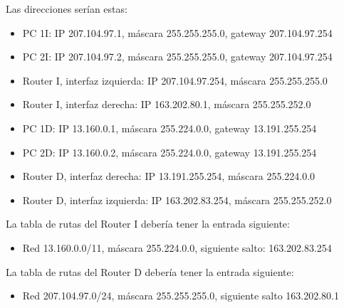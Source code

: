 \documentclass[letterpaper,10pt,spanish]{sphinxmanual}
\begin{document}
\sphinxAtStartPar
Las direcciones serían estas:
\begin{itemize}
\item {} 
\sphinxAtStartPar
PC 1I: IP 207.104.97.1, máscara 255.255.255.0, gateway 207.104.97.254

\item {} 
\sphinxAtStartPar
PC 2I: IP 207.104.97.2, máscara 255.255.255.0, gateway 207.104.97.254

\item {} 
\sphinxAtStartPar
Router I, interfaz izquierda: IP 207.104.97.254, máscara 255.255.255.0

\item {} 
\sphinxAtStartPar
Router I, interfaz derecha: IP 163.202.80.1, máscara 255.255.252.0

\item {} 
\sphinxAtStartPar
PC 1D: IP 13.160.0.1, máscara 255.224.0.0, gateway 13.191.255.254

\item {} 
\sphinxAtStartPar
PC 2D: IP 13.160.0.2, máscara 255.224.0.0, gateway 13.191.255.254

\item {} 
\sphinxAtStartPar
Router D, interfaz derecha: IP 13.191.255.254, máscara 255.224.0.0

\item {} 
\sphinxAtStartPar
Router D, interfaz izquierda: IP 163.202.83.254, máscara 255.255.252.0

\end{itemize}

\sphinxAtStartPar
La tabla de rutas del Router I debería tener la entrada siguiente:
\begin{itemize}
\item {} 
\sphinxAtStartPar
Red 13.160.0.0/11, máscara 255.224.0.0, siguiente salto: 163.202.83.254

\end{itemize}

\sphinxAtStartPar
La tabla de rutas del Router D debería tener la entrada siguiente:
\begin{itemize}
\item {} 
\sphinxAtStartPar
Red 207.104.97.0/24, máscara 255.255.255.0, siguiente salto 163.202.80.1

\end{itemize}
\end{document}
